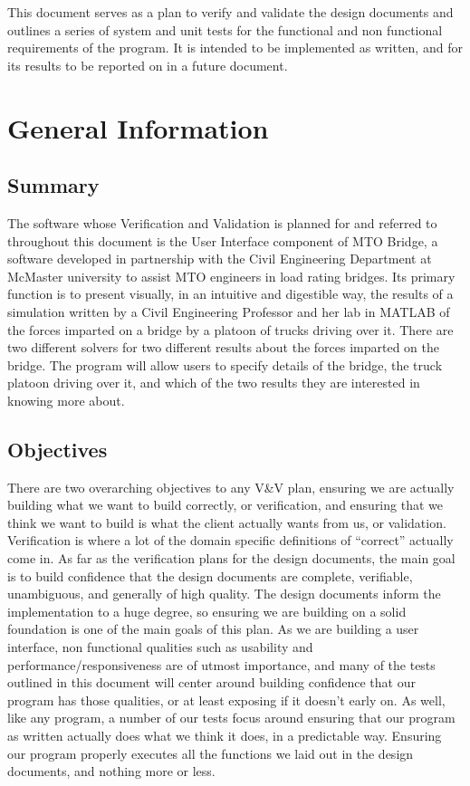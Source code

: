 \documentclass[12pt, titlepage]{article}
\begin{document}

This document serves as a plan to verify and validate the design documents and outlines a series of system and unit tests for the functional and non functional requirements
of the program. It is intended to be implemented as written, and for its results to be reported on in a future document.

\section{General Information}

\subsection{Summary}

The software whose Verification and Validation is planned for and referred to throughout this document is the User Interface component of MTO Bridge, 
a software developed in partnership with the Civil Engineering Department at McMaster university to assist MTO engineers in load rating bridges.
Its primary function is to present visually, in an intuitive and digestible way, the results of a simulation written by a Civil Engineering Professor and her lab 
in MATLAB of the forces imparted on a bridge by a platoon of trucks driving over it. There are two different solvers for two different results about the forces 
imparted on the bridge. The program will allow users to specify details of the bridge, the truck platoon driving over it, and which of the two results they are 
interested in knowing more about.\\ 

\subsection{Objectives}

There are two overarching objectives to any V\&V plan, ensuring we are actually building what we want to build correctly, or verification,
and ensuring that we think we want to build is what the client actually wants from us, or validation. Verification is where a lot of the domain specific definitions
of “correct” actually come in. As far as the verification plans for the design documents, the main goal is to build confidence that the design documents are complete,
verifiable, unambiguous, and generally of high quality. The design documents inform the implementation to a huge degree, so ensuring we are building on a solid foundation
is one of the main goals of this plan. As we are building a user interface, non functional qualities such as usability and performance/responsiveness are of 
utmost importance, and many of the tests outlined in this document will center around building confidence that our program has those qualities, or at least 
exposing if it doesn’t early on. As well, like any program, a number of our tests focus around ensuring that our program as written actually does what we think it does,
in a predictable way. Ensuring our program properly executes all the functions we laid out in the design documents, and nothing more or less.\\
\end{document}
